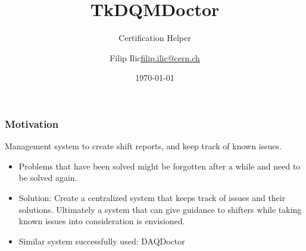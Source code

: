 \documentclass{beamer}
\title{TkDQMDoctor}
\subtitle{Certification Helper}
\author{\texorpdfstring{Filip Ilic\newline\url{filip.ilic@cern.ch}}{Filip ilic}}
\date{\today}
\begin{document}
\maketitle


\begin{frame}
  \frametitle{Motivation} 
  Management system to create shift reports, and keep track of known issues. 
	\begin{itemize}
	\item Problems that have been solved might be forgotten after a while and need to be solved again. 
	\item Solution: Create a centralized system that keeps track of issues and their solutions. 
Ultimately a system that can give guidance to shifters while taking known issues into consideration is envisioned.
	\item Similar system successfully used: DAQDoctor
	\end{itemize}
\end{frame}
\end{document}
